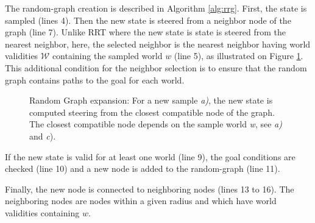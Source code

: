 \documentclass[letterpaper, 10 pt, conference]{ieeeconf}  %
\begin{document}


The random-graph creation is described in Algorithm \ref{alg:rrg}. First, the state is sampled (lines 4). Then the new state is steered from a neighbor node of the graph (line 7). Unlike RRT where the new state is state is steered from the nearest neighbor, here, the selected neighbor is the nearest neighbor having world validities $\mathcal{W}$ containing the sampled world $w$ (line 5), as illustrated on Figure \ref{fig:expansion}. This additional condition for the neighbor selection is to ensure that the random graph contains paths to the goal for each world.
 


\begin{figure}[!htb]
 \caption{Random Graph expansion: For a new sample \textit{a)}, the new state is computed steering from the closest compatible node of the graph. The closest compatible node depends on the sample world \textit{w}, see \textit{a)} and \textit{c}).}
 \label{fig:expansion}
\end{figure}
If the new state is valid for at least one world (line 9), the goal conditions are checked (line 10) and a new node is added to the random-graph (line 11).

Finally, the new node is connected to neighboring nodes (lines 13 to 16). The neighboring nodes are nodes within a given radius and which have world validities containing $w$.
\end{document}
